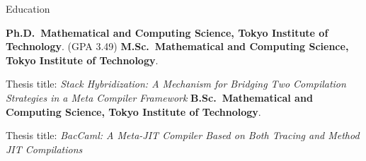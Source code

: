 \begin{rubric}{Education}

\entry*[2020-now]%
\textbf{Ph.D.~Mathematical and Computing Science, Tokyo Institute of Technology}. (GPA 3.49)
%
\entry*[2018-2020]%
\textbf{M.Sc.~Mathematical and Computing Science, Tokyo Institute of Technology}.\par
Thesis title: \textit{Stack Hybridization: A Mechanism for Bridging Two Compilation Strategies in a Meta Compiler Framework}
\entry*[2014-2018]%
\textbf{B.Sc.~Mathematical and Computing Science, Tokyo Institute of Technology}.\par
Thesis title: \textit{BacCaml: A Meta-JIT Compiler Based on Both Tracing and Method JIT Compilations}
\end{rubric}
